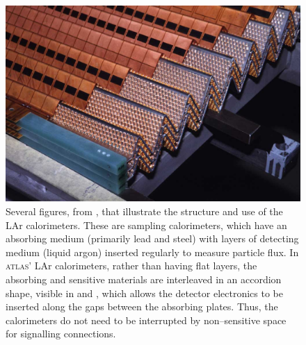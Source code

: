 \begin{figure}[htp]
\begin{minipage}[t]{.4\textwidth}
\caption{Several figures, from \cite{atlasweb}, that illustrate the structure and use of the LAr calorimeters. These are sampling calorimeters, which have an absorbing medium (primarily lead and steel) with layers of detecting medium (liquid argon) inserted regularly to measure particle flux. In \textsc{atlas}' LAr calorimeters, rather than having flat layers, the absorbing and sensitive materials are interleaved in an accordion shape, visible in  and , which allows the detector electronics to be inserted along the gaps between the absorbing plates. Thus, the calorimeters do not need to be interrupted by non--sensitive space for signalling connections.
\label{calostruc}}
\end{minipage}\hfill\begin{minipage}[t]{.57\textwidth}
\phantom{p}

\phantom{p}

    \begin{center}
    \includegraphics[width=\textwidth]{larpic}\makebox[0em][r]{\textcolor{natgreen}{\rule{\textwidth}{1pt}}}
    
    \end{center}
\end{minipage}


\end{figure}
